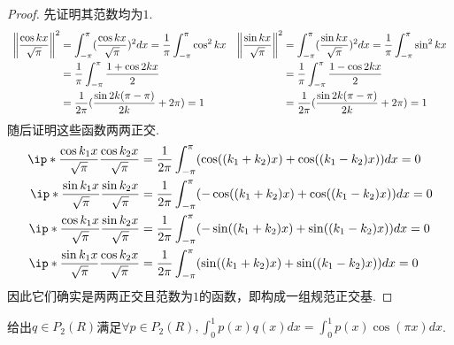 \begin{proof}
    先证明其范数均为\(1\).
    \begin{equation*}
        \begin{array}{cc}
            \begin{aligned}
                \norm*{\dfrac{\cos kx}{\sqrt{\pi}}}^2 &= \int_{-\pi}^{\pi}(\dfrac{\cos kx}{\sqrt{\pi}})^2dx
                =\dfrac{1}{\pi} \int_{-\pi}^{\pi} \cos^2 kx \\
                &=\dfrac{1}{\pi} \int_{-\pi}^{\pi} \dfrac{1+\cos 2kx}{2} \\
                &=\dfrac{1}{2\pi}(\dfrac{\sin 2k(\pi-\pi)}{2k}+2\pi)=1
            \end{aligned}
            &
            \begin{aligned}
                \norm*{\dfrac{\sin kx}{\sqrt{\pi}}}^2 &= \int_{-\pi}^{\pi}(\dfrac{\sin kx}{\sqrt{\pi}})^2dx
                =\dfrac{1}{\pi} \int_{-\pi}^{\pi} \sin^2 kx \\
                &=\dfrac{1}{\pi} \int_{-\pi}^{\pi} \dfrac{1-\cos 2kx}{2} \\
                &=\dfrac{1}{2\pi}(\dfrac{\sin 2k(\pi-\pi)}{2k}+2\pi)=1
            \end{aligned}
        \end{array}
    \end{equation*}
    随后证明这些函数两两正交.
    \begin{align*}
        \ip*{\dfrac{\cos k_1x}{\sqrt{\pi}}}{\dfrac{\cos k_2x}{\sqrt{\pi}}}&
        =\dfrac{1}{2\pi} \int_{-\pi}^{\pi}(\cos((k_1+k_2)x)+\cos((k_1-k_2)x))dx=0 \\
        \ip*{\dfrac{\sin k_1x}{\sqrt{\pi}}}{\dfrac{\sin k_2x}{\sqrt{\pi}}}&
        =\dfrac{1}{2\pi} \int_{-\pi}^{\pi}(-\cos((k_1+k_2)x)+\cos((k_1-k_2)x))dx=0 \\
        \ip*{\dfrac{\cos k_1x}{\sqrt{\pi}}}{\dfrac{\sin k_2x}{\sqrt{\pi}}}&
        =\dfrac{1}{2\pi} \int_{-\pi}^{\pi}(-\sin((k_1+k_2)x)+\sin((k_1-k_2)x))dx=0 \\
        \ip*{\dfrac{\sin k_1x}{\sqrt{\pi}}}{\dfrac{\cos k_2x}{\sqrt{\pi}}}&
        =\dfrac{1}{2\pi} \int_{-\pi}^{\pi}(\sin((k_1+k_2)x)+\sin((k_1-k_2)x))dx=0
    \end{align*}
    因此它们确实是两两正交且范数为\(1\)的函数，即构成一组规范正交基.
\end{proof}

\newpage

\begin{problem}[8]\label{6.B.8}
    给出\(q \in P_2(R)\)满足\(\forall p \in P_2(R),\int_{0}^{1} p(x)q(x)dx=\int_{0}^{1} p(x)\cos(\pi x)dx\).
\end{problem}

